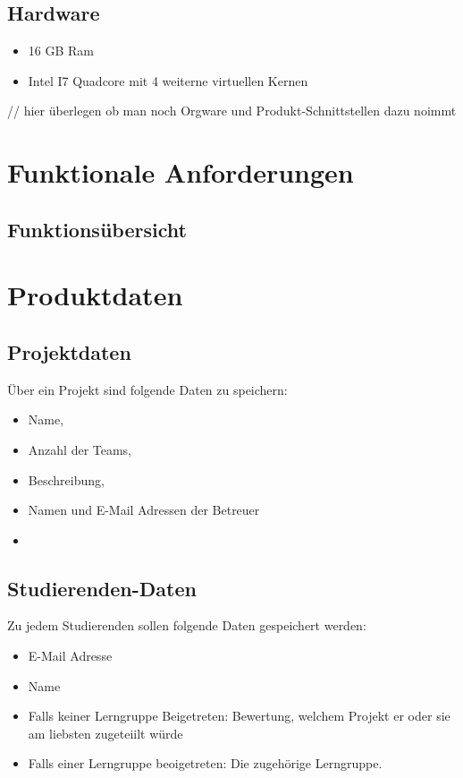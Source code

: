 \documentclass[parskip=full]{scrartcl}
\begin{document}
\subsection{Hardware}
\begin{itemize} 
  \item 16 GB Ram
  \item Intel I7 Quadcore mit 4 weiterne virtuellen Kernen 
\end{itemize}
// hier überlegen ob man noch Orgware und Produkt-Schnittstellen dazu noimmt
\section{Funktionale Anforderungen}

\subsection{Funktionsübersicht}

\section{Produktdaten}

\subsection{Projektdaten} 
Über ein Projekt sind folgende Daten zu speichern:
\begin{itemize} 
  \item Name,
  \item Anzahl der Teams,
  \item Beschreibung,
  \item Namen und E-Mail Adressen der Betreuer
  \item 
\end{itemize}
\subsection{Studierenden-Daten} 
Zu jedem Studierenden sollen folgende Daten gespeichert werden:
\begin{itemize} 
  \item E-Mail Adresse
  \item Name
  \item Falls keiner Lerngruppe Beigetreten: Bewertung, welchem Projekt er oder
  sie am liebsten zugeteiilt würde
  \item Falls einer Lerngruppe beoigetreten: Die zugehörige Lerngruppe.
\end{itemize}
\end{document}
